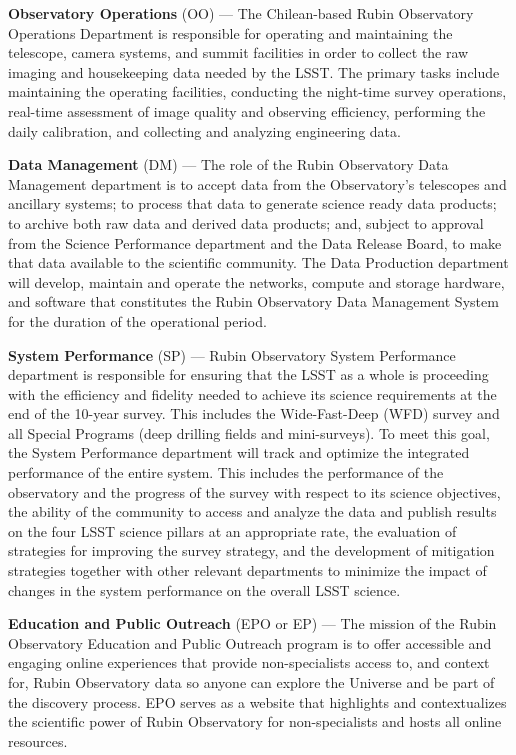 \textbf{Observatory Operations} (OO) ---
The Chilean-based Rubin Observatory Operations Department is responsible for operating and maintaining the telescope, camera systems, and summit facilities in order to collect the raw imaging and housekeeping data needed by the LSST.
The primary tasks include maintaining the operating facilities, conducting the night-time survey operations, real-time assessment of image quality and observing efficiency, performing the daily calibration, and collecting and analyzing engineering data.

\textbf{Data Management} (DM) ---
The role of the Rubin Observatory Data Management department is to accept data from the Observatory's telescopes and ancillary systems; to process that data to generate science ready data products; to archive both raw data and derived data products; and, subject to approval from the Science Performance department and the Data Release Board, to make that data available to the scientific community.
The Data Production department will develop, maintain and operate the networks, compute and storage hardware, and software that constitutes the Rubin Observatory Data Management System for the duration of the operational period.

\textbf{System Performance} (SP) ---
Rubin Observatory System Performance department is responsible for ensuring that the LSST as a whole is proceeding with the efficiency and fidelity needed to achieve its science requirements at the end of the 10-year survey.
This includes the Wide-Fast-Deep (WFD) survey and all Special Programs (deep drilling fields and mini-surveys).
To meet this goal, the System Performance department will track and optimize the integrated performance of the entire system.
This includes the performance of the observatory and the progress of the survey with respect to its science objectives, the ability of the community to access and analyze the data and publish results on the four LSST science pillars at an appropriate rate, the evaluation of strategies for improving the survey strategy, and the development of mitigation strategies together with other relevant departments to minimize the impact of changes in the system performance on the overall LSST science.

\textbf{Education and Public Outreach} (EPO or EP) ---
The mission of the Rubin Observatory Education and Public Outreach program is to offer accessible and engaging online experiences that provide non-specialists access to, and context for, Rubin Observatory data so anyone can explore the Universe and be part of the discovery process.
EPO serves as a website that highlights and contextualizes the scientific power of Rubin Observatory for non-specialists and hosts all online resources.

